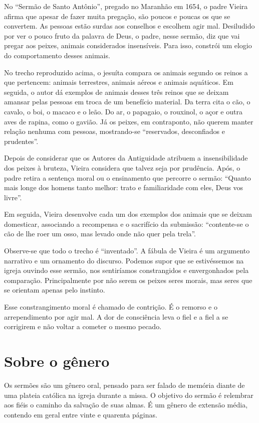 No ``Sermão de Santo Antônio'', pregado no Maranhão em 1654, o padre
Vieira afirma que apesar de fazer muita pregação, são poucos e poucas os
que se convertem. As pessoas estão surdas aos conselhos e escolhem agir
mal. Desiludido por ver o pouco fruto da palavra de Deus, o padre, nesse
sermão, diz que vai pregar aos peixes, animais considerados insensíveis.
Para isso, constrói um elogio do comportamento desses animais.

No trecho reproduzido acima, o jesuíta compara os animais segundo os
reinos a que pertencem: animais terrestres, animais aéreos e animais
aquáticos. Em seguida, o autor dá exemplos de animais desses três reinos
que se deixam amansar pelas pessoas em troca de um benefício material.
Da terra cita o cão, o cavalo, o boi, o macaco e o leão. Do ar, o
papagaio, o rouxinol, o açor e outra aves de rapina, como o gavião. Já
os peixes, em contraponto, não querem manter relação nenhuma com
pessoas, mostrando-se ``reservados, desconfiados e prudentes''.

Depois de considerar que os Autores da Antiguidade atribuem a
insensibilidade dos peixes à bruteza, Vieira considera que talvez seja
por prudência. Após, o padre retira a sentença moral ou o ensinamento
que percorre o sermão: ``Quanto mais longe dos homens tanto melhor:
trato e familiaridade com eles, Deus vos livre''.

Em seguida, Vieira desenvolve cada um dos exemplos dos animais que se
deixam domesticar, associando a recompensa e o sacrifício da submissão:
``contente-se o cão de lhe roer um osso, mas levado onde não quer pela
trela''.

Observe-se que todo o trecho é ``inventado''. A fábula de Vieira é um
argumento narrativo e um ornamento do discurso. Podemos supor que se
estivéssemos na igreja ouvindo esse sermão, nos sentiríamos
constrangidos e envergonhados pela comparação. Principalmente por não
serem os peixes seres morais, mas seres que se orientam apenas pelo
instinto.

Esse constrangimento moral é chamado de contrição. É o remorso e o
arrependimento por agir mal. A dor de consciência leva o fiel e a fiel a
se corrigirem e não voltar a cometer o mesmo pecado.


\section{Sobre o gênero}

Os sermões são um gênero oral, pensado para ser falado de memória diante
de uma plateia católica na igreja durante a missa. O objetivo do sermão
é relembrar aos fiéis o caminho da salvação de suas almas. É um gênero
de extensão média, contendo em geral entre vinte e quarenta páginas.

